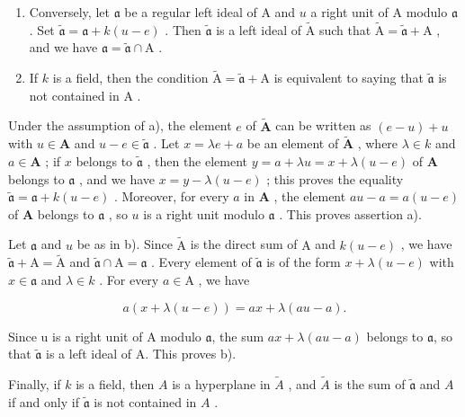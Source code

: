 \begin{enumerate}
\def\labelenumi{\alph{enumi})}
\setcounter{enumi}{1}
\item
  Conversely, let \(\mathfrak{a}\) be a regular left ideal of A and \(u\) a right unit of A modulo \(\mathfrak{a}\) . Set \(\widetilde{\mathfrak{a}} = \mathfrak{a} + k(u - e)\) . Then \(\widetilde{\mathfrak{a}}\) is a left ideal of \(\widetilde{\mathrm{A}}\) such that \(\widetilde{\mathrm{A}} = \widetilde{\mathfrak{a}} + \mathrm{A}\) , and we have \(\mathfrak{a} = \widetilde{\mathfrak{a}} \cap \mathrm{A}\) .
\item
  If \(k\) is a field, then the condition \(\widetilde{\mathrm{A}} = \widetilde{\mathfrak{a}} + \mathrm{A}\) is equivalent to saying that \(\widetilde{\mathfrak{a}}\) is not contained in \(\mathrm{A}\) .
\end{enumerate}

Under the assumption of a), the element \(e\) of \(\widetilde{\mathbf{A}}\) can be written as \((e - u) + u\) with \(u \in \mathbf{A}\) and \(u - e \in \widetilde{\mathfrak{a}}\) . Let \(x = \lambda e + a\) be an element of \(\widetilde{\mathbf{A}}\) , where \(\lambda \in k\) and \(a \in \mathbf{A}\) ; if \(x\) belongs to \(\widetilde{\mathfrak{a}}\) , then the element \(y = a + \lambda u = x + \lambda (u - e)\) of \(\mathbf{A}\) belongs to \(\mathfrak{a}\) , and we have \(x = y - \lambda (u - e)\) ; this proves the equality \(\widetilde{\mathfrak{a}} = \mathfrak{a} + k(u - e)\) . Moreover, for every \(a\) in \(\mathbf{A}\) , the element \(au - a = a(u - e)\) of \(\mathbf{A}\) belongs to \(\mathfrak{a}\) , so \(u\) is a right unit modulo \(\mathfrak{a}\) . This proves assertion a).

Let \(\mathfrak{a}\) and \(u\) be as in b). Since \(\widetilde{\mathrm{A}}\) is the direct sum of \(\mathrm{A}\) and \(k(u - e)\) , we have \(\widetilde{\mathfrak{a}} + \mathrm{A} = \widetilde{\mathrm{A}}\) and \(\widetilde{\mathfrak{a}} \cap \mathrm{A} = \mathfrak{a}\) . Every element of \(\widetilde{\mathfrak{a}}\) is of the form \(x + \lambda (u - e)\) with \(x \in \mathfrak{a}\) and \(\lambda \in k\) . For every \(a \in \mathrm{A}\) , we have

\[
a (x + \lambda (u - e)) = a x + \lambda (a u - a).
\]

Since u is a right unit of A modulo \(\mathfrak{a}\), the sum \(ax + \lambda(au - a)\) belongs to \(\mathfrak{a}\), so that \(\widetilde{\mathfrak{a}}\) is a left ideal of A. This proves b).

Finally, if \(k\) is a field, then \(A\) is a hyperplane in \(\widetilde{A}\) , and \(\widetilde{A}\) is the sum of \(\widetilde{\mathfrak{a}}\) and \(A\) if and only if \(\widetilde{\mathfrak{a}}\) is not contained in \(A\) .


